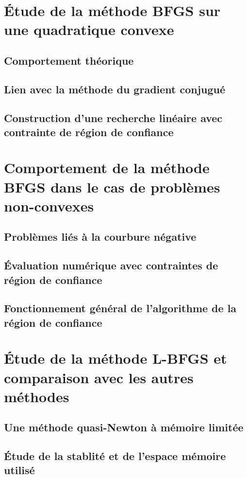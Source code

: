 \section{Étude de la méthode BFGS sur une quadratique convexe} 

\subsection{Comportement théorique}

\subsection{Lien avec la méthode du gradient conjugué}

\subsection{Construction d'une recherche linéaire avec contrainte de région de confiance}

\section{Comportement de la méthode BFGS dans le cas de problèmes non-convexes}

\subsection{Problèmes liés à la courbure négative}

\subsection{Évaluation numérique avec contraintes de région de confiance}



\subsection{Fonctionnement général de l'algorithme de la région de confiance}

\section{Étude de la méthode L-BFGS et comparaison avec les autres méthodes}

\subsection{Une méthode quasi-Newton à mémoire limitée}

\subsection{Étude de la stablité et de l'espace mémoire utilisé}